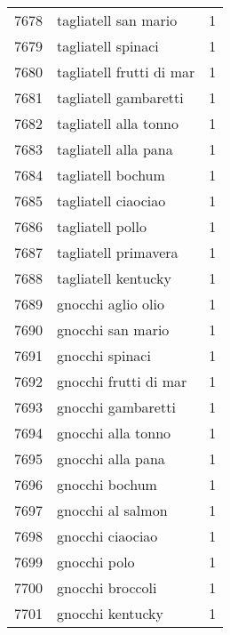 \begin{tabular}{llr}
7678 &                               tagliatell san mario &      1 \\
7679 &                                 tagliatell spinaci &      1 \\
7680 &                           tagliatell frutti di mar &      1 \\
7681 &                              tagliatell gambaretti &      1 \\
7682 &                              tagliatell alla tonno &      1 \\
7683 &                               tagliatell alla pana &      1 \\
7684 &                                  tagliatell bochum &      1 \\
7685 &                                tagliatell ciaociao &      1 \\
7686 &                                   tagliatell pollo &      1 \\
7687 &                               tagliatell primavera &      1 \\
7688 &                                tagliatell kentucky &      1 \\
7689 &                                 gnocchi aglio olio &      1 \\
7690 &                                  gnocchi san mario &      1 \\
7691 &                                    gnocchi spinaci &      1 \\
7692 &                              gnocchi frutti di mar &      1 \\
7693 &                                 gnocchi gambaretti &      1 \\
7694 &                                 gnocchi alla tonno &      1 \\
7695 &                                  gnocchi alla pana &      1 \\
7696 &                                     gnocchi bochum &      1 \\
7697 &                                  gnocchi al salmon &      1 \\
7698 &                                   gnocchi ciaociao &      1 \\
7699 &                                       gnocchi polo &      1 \\
7700 &                                   gnocchi broccoli &      1 \\
7701 &                                   gnocchi kentucky &      1 \\

\end{tabular}
